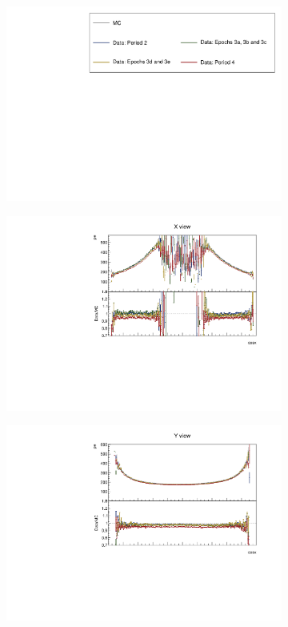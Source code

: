 \documentclass[12pt,a4paper]{article}
\begin{document}
\begin{figure}[!ht]
  \begin{subfigure}{\textwidth}
  \centering
    \includegraphics[height=0.2\linewidth]{essentialsec_tb/legend.pdf}
  \end{subfigure}
  \vspace*{2mm}

  \begin{subfigure}{0.5\textwidth}
    \includegraphics[width=\linewidth]{PlotsAngularDistribution/pe_cosx_x.pdf}
  \end{subfigure}
  \begin{subfigure}{0.5\textwidth}
    \includegraphics[width=\linewidth]{PlotsAngularDistribution/pe_cosx_y.pdf}

\end{subfigure}
\end{figure}
\end{document}
